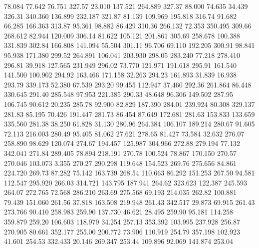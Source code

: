   78.084   77.642   76.751       327.57
  23.010  137.521  264.889       327.37
  88.000   74.635   34.439       326.31
 340.360  136.899  232.187       321.87
  81.139  109.969  195.818       316.74
  91.682   66.285  166.363       313.87
  95.361   98.882   86.429       310.36
 266.132   72.353  350.495       309.66
 268.612   82.944  120.009       306.14
  81.622  105.121  201.861       305.69
 258.678  100.388  331.839       302.84
 166.808  141.094   55.504       301.11
  96.706   69.110  192.205       300.91
  98.841   95.938  171.380       299.52
 264.891  106.041  203.930       298.05
 283.240   77.218  278.410       296.81
  39.918  127.565  231.949       296.02
  73.770  121.971  191.618       295.91
 161.540  141.500  100.902       294.92
 163.466  171.158   32.263       294.23
 161.893   31.839   16.938       293.79
 339.173   52.380   67.539       293.20
  99.455  112.947   37.460       292.36
 261.864   86.448  330.645       291.40
 285.548   97.953  221.385       290.33
  48.648   96.306  149.502       287.95
 106.745   90.612   20.235       285.78
  92.900   82.829  187.390       284.01
 239.924   80.308  329.137       281.83
  85.195   70.426  191.447       281.73
  86.454   87.649  172.681       281.63
 153.833  133.659  335.560       281.38
  38.250   61.828   31.130       280.96
 264.384  106.107  189.214       280.67
  91.605   72.113  216.003       280.49
  95.405   81.062   27.621       278.65
  81.427   73.584   32.632       276.07
 258.890   98.629  120.074       274.67
 194.457  125.987  304.966       272.88
 279.194   77.132  342.041       271.84
 289.405   78.894  218.191       270.78
 100.524   78.867  170.150       270.57
 270.046  103.073    3.355       270.27
 290.298  119.648  154.523       269.76
 275.656   84.861  224.720       269.73
  87.282   75.142  163.739       268.54
 110.663   86.292  151.253       267.50
  94.581  112.547  295.920       266.03
 314.721  143.795  187.941       264.62
 323.623  122.387  245.593       264.07
 272.765   72.568  286.210       263.69
 275.568   69.193  214.035       262.82
 100.881   79.439  151.060       261.56
  37.818  163.508  219.948       261.43
 342.517   29.873   69.915       261.43
 273.766   90.410  258.983       259.90
 137.730   46.621   28.495       259.90
  95.181  114.258  359.879       259.20
 106.603  118.979   34.254       257.13
 353.392  103.995  237.928       256.87
 270.905   80.661  352.177       255.00
 200.772   73.906  110.919       254.79
 357.198  102.923   41.601       254.53
 332.433   20.146  269.347       253.44
 109.896   92.069  141.874       253.04
